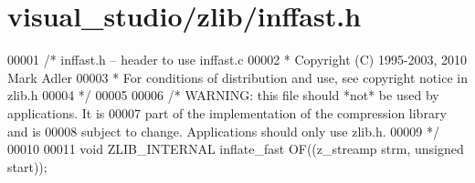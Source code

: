 \hypertarget{visual__studio_2zlib_2inffast_8h_source}{}\section{visual\+\_\+studio/zlib/inffast.h}
\label{visual__studio_2zlib_2inffast_8h_source}

\begin{DoxyCode}
00001 \textcolor{comment}{/* inffast.h -- header to use inffast.c}
00002 \textcolor{comment}{ * Copyright (C) 1995-2003, 2010 Mark Adler}
00003 \textcolor{comment}{ * For conditions of distribution and use, see copyright notice in zlib.h}
00004 \textcolor{comment}{ */}
00005 
00006 \textcolor{comment}{/* WARNING: this file should *not* be used by applications. It is}
00007 \textcolor{comment}{   part of the implementation of the compression library and is}
00008 \textcolor{comment}{   subject to change. Applications should only use zlib.h.}
00009 \textcolor{comment}{ */}
00010 
00011 \textcolor{keywordtype}{void} ZLIB\_INTERNAL inflate\_fast OF((z\_streamp strm, \textcolor{keywordtype}{unsigned} start));
\end{DoxyCode}
